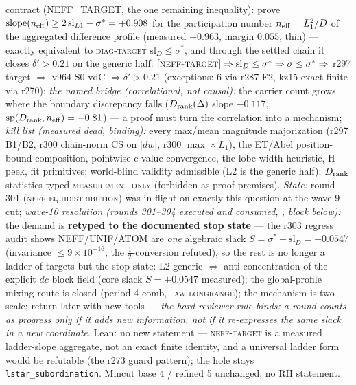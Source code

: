 {{contract (NEFF\_TARGET, the one remaining inequality):} prove
$\mathrm{slope}(n_{\rm eff}) \ge 2\,\mathrm{sl}_{L1} - \sigma^* =
+0.908$ for the participation number $n_{\rm eff} = L_1^2/D$ of
the aggregated difference profile (measured $+0.963$, margin
$0.055$, thin) --- exactly equivalent to \textsc{diag-target}
$\mathrm{sl}_D \le \sigma^*$, and through the settled chain it
closes $\delta' > 0.21$ on the generic half:
$[\textsc{neff-target}] \Rightarrow \mathrm{sl}_D \le \sigma^*
\Rightarrow \sigma \le \sigma^* \Rightarrow$ r297 target
$\Rightarrow$ v964-S0 vdC $\Rightarrow \delta' > 0.21$
(exceptions: 6 via r287 F2, kz15 exact-finite via r270);
\emph{the named bridge (correlational, not causal):} the carrier
count grows where the boundary discrepancy falls
($D_{\rm rank}(\Delta)$ slope $-0.117$,
$\mathrm{sp}(D_{\rm rank}, n_{\rm eff}) = -0.81$) --- a proof must
turn the correlation into a mechanism; \emph{kill list (measured
dead, binding):} every max/mean magnitude majorization (r297
B1/B2, r300 chain-norm CS on $|dw|$, r300 $\max\times L_1$), the
ET/Abel position-bound composition, pointwise c-value convergence,
the lobe-width heuristic, H-peek, fit primitives; world-blind
validity admissible (L2 is the generic half); $D_{\rm rank}$
statistics typed \textsc{measurement-only} (forbidden as proof
premises).  \emph{State:} round 301
(\textsc{neff-equidistribution}) was in flight on exactly this
question at the wave-9 cut; \emph{wave-10 resolution (rounds
301--304 executed and consumed,
, block below):} the demand
is \textbf{retyped to the documented stop state} --- the r303
regress audit shows NEFF/UNIF/ATOM are \emph{one} algebraic
slack $S = \sigma^* - \mathrm{sl}_D = +0.0547$ (invariance $\le
9\times10^{-16}$; the $\tfrac12$-conversion refuted), so the
rest is no longer a ladder of targets but the stop state: L2
generic $\Leftrightarrow$ anti-concentration of the explicit
$dc$ block field (core slack $S = +0.0547$ measured); the
global-profile mixing route is closed (period-4 comb,
\textsc{law-longrange}); the mechanism is two-scale; return
later with new tools --- \emph{the hard reviewer rule binds: a
round counts as progress only if it adds new information, not
if it re-expresses the same slack in a new coordinate}.
Lean: no new statement --- \textsc{neff-target} is a measured
ladder-slope aggregate, not an exact finite identity, and a
universal ladder form would be refutable (the r273 guard pattern);
the hole stays \texttt{lstar\_subordination}.  Mincut base 4 /
refined 5 unchanged; no RH statement.\par}


